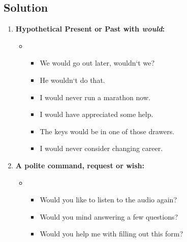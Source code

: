\subsection*{Solution}
\begin{enumerate}
      \item \textbf{Hypothetical Present or Past with \textit{would}:}
            \begin{itemize}
                  \item {}
                        \begin{itemize}
                              \item We would go out later, wouldn`t we?
                              \item He wouldn`t do that.
                              \item I would never run a marathon now.
                              \item I would have appreciated some help.
                              \item The keys would be in one of those drawers.
                              \item I would never consider changing career.
                        \end{itemize}
            \end{itemize}

      \item \textbf{A polite command, request or wish:}
            \begin{itemize}
                  \item {}
                        \begin{itemize}
                              \item Would you like to listen to the audio again?
                              \item Would you mind answering a few questions?
                              \item Would you help me with filling out this form?
                        \end{itemize}
            \end{itemize}


\end{enumerate}
